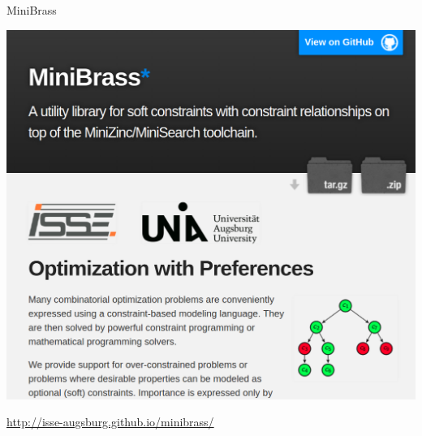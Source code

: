 
\begin{frame}[fragile]{MiniBrass}

\begin{center}

\includegraphics[width=.5\textwidth]{img/minibrass.png}

\vspace*{2ex}

\url{http://isse-augsburg.github.io/minibrass/}

\end{center}

\end{frame}

